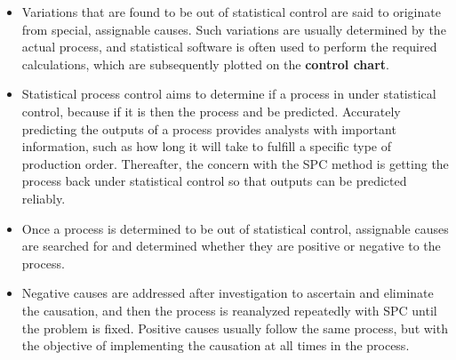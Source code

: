 \documentclass[12pt]{article}
\begin{document}
\begin{itemize}
\item 
Variations that are found to be out of statistical control are said to originate from special, assignable causes. Such variations are usually determined by the actual process, and statistical software is often used to perform the required calculations, which are subsequently plotted on the \textbf{control chart}. 

\item
Statistical process control aims to determine if a process in under statistical control, because if it is then the process and be predicted. Accurately predicting the outputs of a process provides analysts with important information, such as how long it will take to fulfill a specific type of production order. Thereafter, the concern with the SPC method is getting the process back under statistical control so that outputs can be predicted reliably.

\item
Once a process is determined to be out of statistical control, assignable causes are searched for and determined whether they are positive or negative to the process.

\item 

Negative causes are addressed after investigation to ascertain and eliminate the causation, and then the process is reanalyzed repeatedly with SPC until the problem is fixed. Positive causes usually follow the same process, but with the objective of implementing the causation at all times in the process.
\end{itemize}
\newpage
\end{document}
